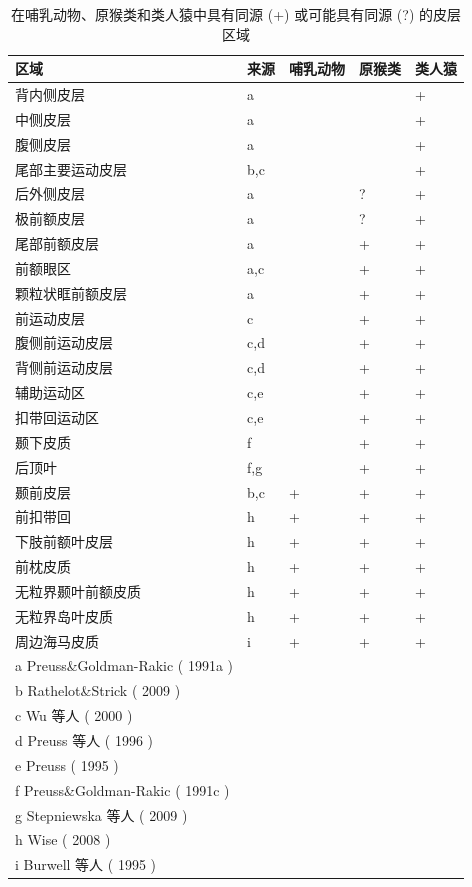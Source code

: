 \begin{table}[htbp]
	\centering
	\caption{在哺乳动物、原猴类和类人猿中具有同源 (+) 或可能具有同源 (?) 的皮层区域}
	\setlength{\tabcolsep}{8mm}	
	\renewcommand\arraystretch{1.5}	
	\begin{tabular}{lllll}
		\toprule
		区域 & 来源 & 哺乳动物 & 原猴类 & 类人猿 \\
		\midrule
		背内侧皮层 & a & & &+  \\
		中侧皮层 & a & & &+  \\
		腹侧皮层 & a & & &+  \\
		尾部主要运动皮层 & b,c & & &+  \\
		后外侧皮层 & a & &? &+  \\
		极前额皮层&  a & &? &+  \\
		尾部前额皮层&  a & &+ &+  \\
		前额眼区& a,c & &+ &+  \\
		颗粒状眶前额皮层& a & &+ &+  \\
		前运动皮层& c & &+ &+   \\
		腹侧前运动皮层& c,d & &+ &+  \\
		背侧前运动皮层& c,d & &+ &+  \\
		辅助运动区& c,e & &+ &+  \\
		扣带回运动区& c,e & &+ &+   \\
		颞下皮质& f & &+ &+   \\
		后顶叶 & f,g & &+ &+  \\
		颞前皮层 &  b,c &+ &+ &+  \\
		前扣带回 &  h &+ &+ &+  \\
		下肢前额叶皮层 & h &+ &+ &+  \\
		前枕皮质 & h &+ &+ &+  \\
		无粒界颞叶前额皮质 & h &+ &+ &+  \\
		无粒界岛叶皮质 & h &+ &+ &+  \\
		周边海马皮质 & i &+ &+ &+  \\
		\bottomrule
		a Preuss\&Goldman-Rakic (  1991a  ) \\
		b Rathelot\&Strick (  2009  )\\
		c Wu 等人 (  2000  )\\
		d Preuss 等人 (  1996  ) \\
		e Preuss (  1995  ) \\
		f Preuss\&Goldman-Rakic (  1991c  ) \\
		g Stepniewska 等人 (  2009  ) \\
		h Wise (  2008  ) \\
		i Burwell 等人 (  1995  )
		\label{tab:tab_2_2}
	\end{tabular}%
\end{table}%

